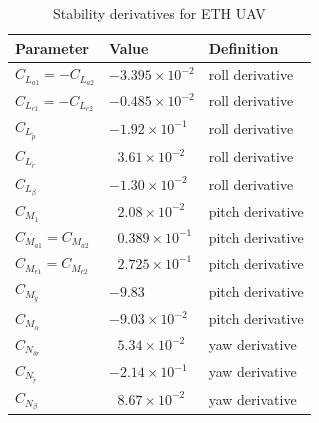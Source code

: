 \begin{table}
\label{arm:momentsETHcraft}
\caption{Stability derivatives for ETH UAV \cite{ducard2009fault}}
\label{arm:ethcraft}
\begin{center}
\begin{tabular}{ ||p{3cm}|p{3cm}|p{3cm}||}\hline
\textbf{Parameter} & \textbf{Value} & \textbf{Definition} \\\hline
$C_{L_{a1}} = - C_{L_{a2}}$ & $-3.395 \times 10^{-2}$	   & roll derivative \\\hline
$C_{L_{e1}} = - C_{L_{e2}}$ & $-0.485 \times 10^{-2}$         & roll derivative \\\hline
$C_{L_{\tilde{p}}}$                 & $-1.92 \times 10^{-1}$	   & roll derivative \\\hline
$C_{L_{\tilde{r}}} $                 & $\ \ \, 3.61 \times 10^{-2}$     & roll derivative \\\hline
$C_{L_\beta}$                        & $-1.30 \times 10^{-2}$	   & roll derivative \\\hline
$ C_{M_{1}}$                          & $\ \ \, 2.08 \times 10^{-2}$	   & pitch derivative \\\hline
$C_{M_{a1}} = C_{M_{a2}} $ & $\ \ \, 0.389 \times 10^{-1}$  & pitch derivative \\\hline
$C_{M_{e1}} = C_{M_{e2}} $ & $\ \ \, 2.725 \times 10^{-1}$  &  pitch derivative \\\hline
$C_{M_{\tilde{q}}} $               & $-9.83$	                            & pitch derivative \\\hline
$C_{M_\alpha} $                    & $-9.03 \times 10^{-2}$ 	   & pitch derivative \\\hline
$C_{N_{\delta r}}$                  & $\ \ \, 5.34 \times 10^{-2}$ 	   & yaw derivative \\\hline
$ C_{N_{\tilde{r}}}$                 & $-2.14 \times 10^{-1}$	   & yaw derivative \\\hline
$C_{N_\beta} $                       & $\ \ \, 8.67 \times 10^{-2}$	     & yaw derivative \\\hline
\end{tabular}
\end{center}
\end{table}

